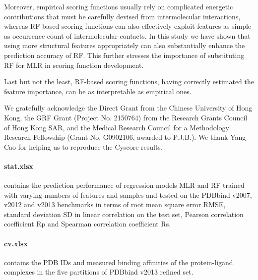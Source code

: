 \documentclass[journal=jacsat,manuscript=article]{achemso}
\begin{document}
Moreover, empirical scoring functions usually rely on complicated energetic contributions that must be carefully devised from intermolecular interactions, whereas RF-based scoring functions can also effectively exploit features as simple as occurrence count of intermolecular contacts. In this study we have shown that using more structural features appropriately can also substantially enhance the prediction accuracy of RF. This further stresses the importance of substituting RF for MLR in scoring function development.

Last but not the least, RF-based scoring functions, having correctly estimated the feature importance, can be as interpretable as empirical ones.

\begin{acknowledgement}

We gratefully acknowledge the Direct Grant from the Chinese University of Hong Kong, the GRF Grant (Project No. 2150764) from the Research Grants Council of Hong Kong SAR, and the Medical Research Council for a Methodology Research Fellowship (Grant No. G0902106, awarded to P.J.B.). We thank Yang Cao for helping us to reproduce the Cyscore results.

\end{acknowledgement}

\begin{suppinfo}

\paragraph{stat.xlsx} contains the prediction performance of regression models MLR and RF trained with varying numbers of features and samples and tested on the PDBbind v2007, v2012 and v2013 benchmarks in terms of root mean square error RMSE, standard deviation SD in linear correlation on the test set, Pearson correlation coefficient Rp and Spearman correlation coefficient Rs.

\paragraph{cv.xlsx} contains the PDB IDs and measured binding affinities of the protein-ligand complexes in the five partitions of PDBbind v2013 refined set.

\end{suppinfo}


\end{document}
